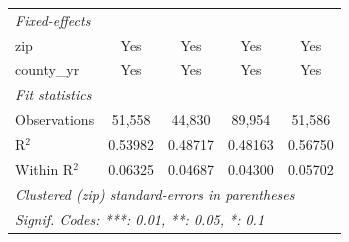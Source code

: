 \begin{tabular}{lcccc}
   \midrule
   \emph{Fixed-effects}\\
   zip                                           & Yes             & Yes             & Yes             & Yes\\  
   county\_yr                                    & Yes             & Yes             & Yes             & Yes\\  
   \midrule
   \emph{Fit statistics}\\
   Observations                                  & 51,558          & 44,830          & 89,954          & 51,586\\  
   R$^2$                                         & 0.53982         & 0.48717         & 0.48163         & 0.56750\\  
   Within R$^2$                                  & 0.06325         & 0.04687         & 0.04300         & 0.05702\\  
   \midrule \midrule
   \multicolumn{5}{l}{\emph{Clustered (zip) standard-errors in parentheses}}\\
   \multicolumn{5}{l}{\emph{Signif. Codes: ***: 0.01, **: 0.05, *: 0.1}}\\
\end{tabular}
\par\endgroup
